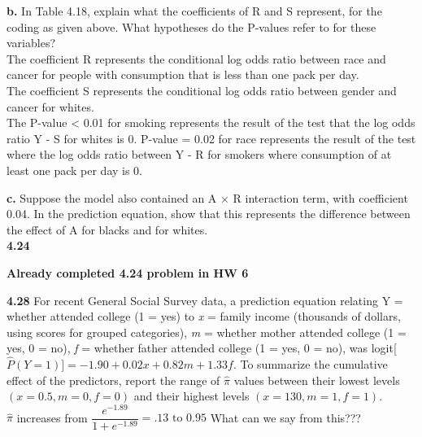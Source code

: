 \documentclass[paper=letter, fontsize=11pt]{scrartcl} %
\begin{document}
\textbf{b.} In Table 4.18, explain what the coefficients of R and S represent, for the
coding as given above. What hypotheses do the P-values refer to for these
variables? \\

The coefficient R represents the conditional log odds ratio between race and cancer for
people with consumption that is less than one pack per day. \\
The coefficient S represents the conditional log odds ratio between gender and cancer 
for whites. \\
The P-value < 0.01 for smoking represents the result of the test that the log odds ratio Y - S
for whites is 0. P-value = 0.02 for race represents the result of the test where the log
odds ratio between Y - R for smokers where consumption of at least one pack per day is 0.

\textbf{c.} Suppose the model also contained an A × R interaction term, with coefficient
0.04. In the prediction equation, show that this represents the
difference between the effect of A for blacks and for whites.
\\

\textbf{4.24}
\begin{center}
	\textbf{Already completed 4.24 problem in HW 6}
\end{center}

\textbf{4.28} For recent General Social Survey data, a prediction equation relating Y =
whether attended college (1 = yes) to \textit{x} = family income (thousands of dollars,
using scores for grouped categories), \textit{m} = whether mother attended
college (1 = yes, 0 = no), \textit{f} = whether father attended college (1 = yes,
0 = no), was logit[$\hat{P}(Y = 1)] = −1.90 + 0.02x + 0.82m + 1.33f$. To summarize
the cumulative effect of the predictors, report the range of $\hat{\pi}$ values
between their lowest levels $(x = 0.5, m = 0, f = 0)$ and their highest levels
$(x = 130, m = 1, f = 1)$.
\\
$\hat{\pi}$ increases from $\dfrac{e^{-1.89}}{1+e^{-1.89}} = .13 \text{ to } 0.95$
What can we say from this???
\\
\end{document}
